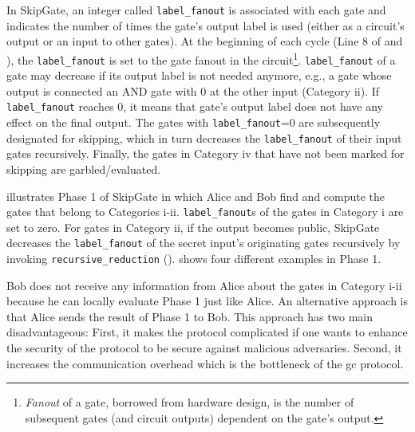 In SkipGate, an integer called \texttt{label\_fanout} is associated with each gate and indicates the number of times the gate's output label is used (either as a circuit's output or an input to other gates).
At the beginning of each cycle (Line 8 of  and ), the \texttt{label\_fanout} is set to the gate fanout in the circuit\footnote{\textit{Fanout} of a gate, borrowed from hardware design, is the number of subsequent gates (and circuit outputs) dependent on the gate’s output.}.
\texttt{label\_fanout} of a gate may decrease if its output label is not needed anymore, e.g., a gate whose output is connected an AND gate with 0 at the other input (Category ii).
If \texttt{label\_fanout} reaches 0, it means that gate's output label does not have any effect on the final output.
The gates with \texttt{label\_fanout}=0 are subsequently designated for skipping, which in turn decreases the \texttt{label\_fanout} of their input gates recursively.
Finally, the gates in Category iv that have not been marked for skipping are garbled/evaluated.

\begin{algorithm}[]
\caption{Phase 1 in SkipGate for both Alice and Bob sides.}\label{alg:phase1}
\begin{algorithmic}[1]
		\ENDIF
	\ENDIF
\ENDFOR
\end{algorithmic}
\end{algorithm}

 illustrates Phase 1 of SkipGate in which Alice and Bob find and compute the gates that belong to Categories i-ii.
\texttt{label\_fanout}s of the gates in Category i are set to zero.
For gates in Category ii, if the output becomes public, SkipGate decreases the \texttt{label\_fanout} of the secret input's originating gates recursively by invoking \texttt{recursive\_reduction} ().
 shows four different examples in Phase 1.

Bob does not receive any information from Alice about the gates in Category i-ii because he can locally evaluate Phase 1 just like Alice.
An alternative approach is that Alice sends the result of Phase 1 to Bob.
This approach has two main disadvantageous:
First, it makes the protocol complicated if one wants to enhance the security of the protocol to be secure against malicious adversaries.
Second, it increases the communication overhead which is the bottleneck of the \acrshort{gc} protocol.

